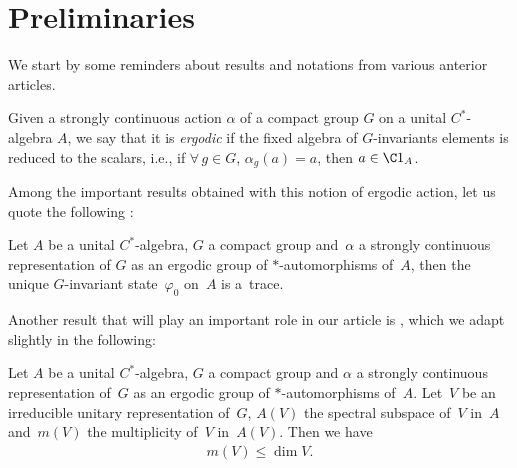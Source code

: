 \section{Preliminaries}
\label{Sec:Reminders}

We start by some reminders about results and notations from various anterior articles.
\begin{Definition}
Given a strongly continuous action $\alpha$ of a compact group $G$ on a unital $C^*$-algebra $A$, we say that it is \emph{ergodic} if the f\/ixed algebra of $G$-invariants elements is reduced to the scalars, i.e., if $\forall \, g \in G$, $\alpha_g(a) = a$, then $a \in \C 1_A$.
\end{Definition}

Among the important results obtained with this notion of ergodic action, let us quote the following \cite[Theorem~4.1, p.~82]{ErgodCpctGpHKLS}:
\begin{Theorem}
\label{Thm:ErgodAct}
Let $A$ be a unital $C^*$-algebra, $G$ a compact group and~$\alpha$ a strongly continuous representation of $G$ as an ergodic group of $*$-automorphisms of~$A$, then the unique $G$-invariant state~$\varphi_0$ on~$A$ is a~trace.
\end{Theorem}

Another result that will play an important role in our article is %
\cite[Proposition~2.1, p.~76]{ErgodCpctGpHKLS}, which we adapt slightly in the following:
\begin{Proposition}
\label{Prop:multiplicity}
Let $A$ be a unital $C^*$-algebra, $G$ a compact group and $\alpha$ a strongly continuous representation of~$G$ as an ergodic group of $*$-automorphisms of~$A$. Let~$V$ be an irreducible unitary representation of~$G$, $A(V)$ the spectral subspace of~$V$ in~$A$ and~$m(V)$ the multiplicity of~$V$ in~$A(V)$. Then we have
\begin{gather*}
m(V) \leqslant \dim V.
\end{gather*}
\end{Proposition}

